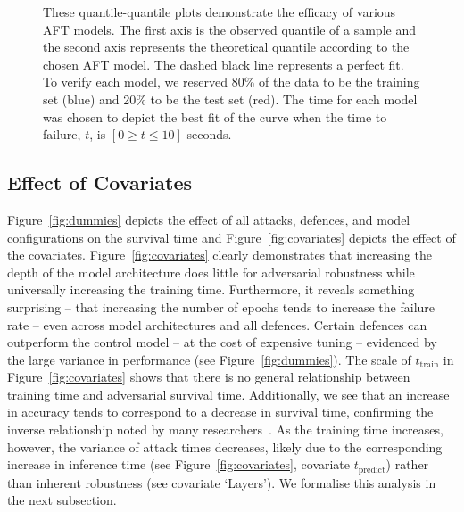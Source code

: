 \begin{figure}
\begin{subfigure}
	\end{subfigure}
	\caption{These quantile-quantile plots demonstrate the efficacy of various AFT models. The first axis is the observed quantile of a sample and the second axis represents the theoretical quantile according to the chosen AFT model. The dashed black line represents a perfect fit. To verify each model, we reserved 80\% of the data to be the training set (blue) and 20\% to be the test set (red). The time for each model was chosen to depict the best fit of the curve when the time to failure, $t$, is $ [ 0 \geq t \leq 10 ] $ seconds.
 }
	\label{fig:aft_models}
\end{figure}

\subsection{Effect of Covariates}
Figure~\ref{fig:dummies} depicts the effect of all attacks, defences, and model configurations on the survival time and Figure~\ref{fig:covariates} depicts the effect of the covariates.
Figure~\ref{fig:covariates} clearly demonstrates that increasing the depth of the model architecture does little for adversarial robustness while universally increasing the training time.
Furthermore, it reveals something surprising -- that increasing the number of epochs tends to increase the failure rate -- even across model architectures and all defences.
Certain defences can outperform the control model -- at the cost of expensive tuning -- evidenced by the large variance in performance (see Figure~\ref{fig:dummies}). The scale of $t_{\mathrm{train}}$  in Figure~\ref{fig:covariates} shows that there is no general relationship between training time and adversarial survival time. Additionally, we see that an increase in accuracy tends to correspond to a decrease in survival time, confirming the inverse relationship noted by many researchers~\cite{carlini_towards_2017,biggio_evasion_2013,croce_reliable_2020}.
As the training time increases, however, the variance of attack times decreases, likely due to the corresponding increase in inference time (see Figure~\ref{fig:covariates}, covariate $t_{\mathrm{predict}}$) rather than inherent robustness (see covariate `Layers').
We formalise this analysis in the next subsection.

